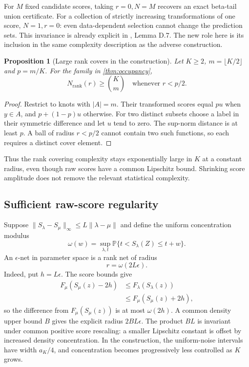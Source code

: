 \documentclass{article}
\newtheorem{proposition}[theorem]{Proposition}
\newcommand{\PP}{\mathbb P}
\newcommand{\ranknet}{N_{\mathrm{rank}}}
\begin{document}
For $M$ fixed candidate scores, taking $r=0,N=M$ recovers an exact beta-tail union certificate. For a collection of strictly increasing transformations of one score, $N=1,r=0$: even data-dependent selection cannot change the prediction sets. This invariance is already explicit in \citet{zeng2025}, Lemma D.7. The new role here is its inclusion in the same complexity description as the adverse construction.

\begin{proposition}[Large rank covers in the construction]\label{prop:separation}
Let $K\ge2$, $m=\lfloor K/2\rfloor$ and $p=m/K$. For the family in \cref{thm:occupancy},
\begin{equation}
 \ranknet(r)\ge \binom{K}{m}\quad\text{whenever }r<p/2.
\end{equation}
\end{proposition}
\begin{proof}
Restrict to knots with $|A|=m$. Their transformed scores equal $pu$ when $y\in A$, and $p+(1-p)u$ otherwise. For two distinct subsets choose a label in their symmetric difference and let $u$ tend to zero. The sup-norm distance is at least $p$. A ball of radius $r<p/2$ cannot contain two such functions, so each requires a distinct cover element.
\end{proof}

Thus the rank covering complexity stays exponentially large in $K$ at a constant radius, even though raw scores have a common Lipschitz bound. Shrinking score amplitude does not remove the relevant statistical complexity.

\subsection{Sufficient raw-score regularity}

Suppose $\|S_\lambda-S_\mu\|_\infty\le L\|\lambda-\mu\|$ and define the uniform concentration modulus
\begin{equation}
 \omega(w)=\sup_{\lambda,t}\PP\{t<S_\lambda(Z)\le t+w\}.
\end{equation}
An $\epsilon$-net in parameter space is a rank net of radius
\begin{equation}\label{eq:transfer}
 r=\omega(2L\epsilon).
\end{equation}
Indeed, put $h=L\epsilon$. The score bounds give
\begin{align*}
 F_\mu(S_\mu(z)-2h)&\le F_\lambda(S_\lambda(z))\\
                  &\le F_\mu(S_\mu(z)+2h),
\end{align*}
so the difference from $F_\mu(S_\mu(z))$ is at most $\omega(2h)$. A common density upper bound $B$ gives the explicit radius $2BL\epsilon$. The product $BL$ is invariant under common positive score rescaling: a smaller Lipschitz constant is offset by increased density concentration. In the construction, the uniform-noise intervals have width $a_K/4$, and concentration becomes progressively less controlled as $K$ grows.
\end{document}
